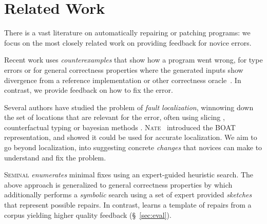 \section{Related Work}
\label{sec:related-work}

There is a vast literature on automatically repairing or patching programs:
we focus on the most closely related work on providing feedback for novice errors.

%
Recent work uses \emph{counterexamples} that show how
a program went wrong, for type errors \cite{Seidel2016-ul}
or for general correctness properties where the generated
inputs show divergence from a reference implementation or
other correctness oracle~\cite{Song_2019}.
In contrast, we provide feedback on how to fix the error.

 Several authors have studied the problem of
\emph{fault localization}, \ie winnowing down the set of locations that are
relevant for the error, often using slicing
\citep{Wand1986-nw,Haack2003-vc,Tip2001-qp,Rahli2015-tt}, counterfactual typing
\citep{Chen2014-gd} or bayesian methods \citep{Zhang2014-lv}.
%
\textsc{Nate}~\citep{Seidel:2017} introduced the BOAT representation,
and showed it could be used for accurate localization.
%
We aim to go beyond localization, into suggesting concrete \emph{changes} that
novices can make to understand and fix the problem.

%
\textsc{Seminal} \citep{Lerner2007-dt} \emph{enumerates} minimal fixes using an
expert-guided heuristic search.
%
The above approach is generalized to general correctness properties by
\cite{singh2013} which additionally performs a \emph{symbolic} search using a
set of expert provided \emph{sketches} that represent possible repairs.
%
In contrast, \toolname learns a template of repairs from a corpus yielding
higher quality feedback (\S~\ref{sec:eval}).

